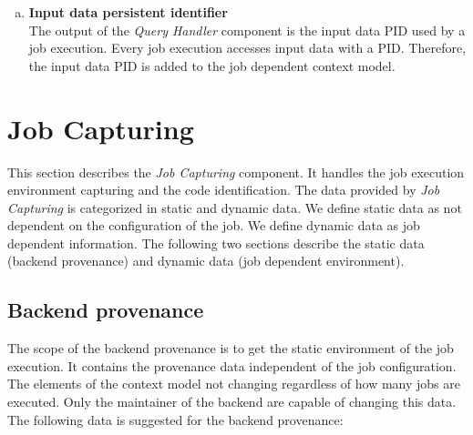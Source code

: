 \documentclass[draft,final]{vutinfth} %
\begin{document}
\begin{enumerate}[(a)]
\item \textbf{Input data persistent identifier} \\
	The output of the \textit{Query Handler} component is the input data PID used by a job execution. Every job execution accesses input data with a PID. Therefore, the input data PID is added to the job dependent context model. 
\end{enumerate}

\section{Job Capturing}\label{Design:Job Capturing}
This section describes the \textit{Job Capturing} component. It handles the job execution environment capturing and the code identification. The data provided by \textit{Job Capturing} is categorized in static and dynamic data. We define static data as not dependent on the configuration of the job. We define dynamic data as job dependent information. The following two sections describe the static data (backend provenance) and dynamic data (job dependent environment).

\subsection{Backend provenance}\label{Design:Backend provenance}
The scope of the backend provenance is to get the static environment of the job execution. It contains the provenance data independent of the job configuration. The elements of the context model not changing regardless of how many jobs are executed. Only the maintainer of the backend are capable of changing this data. The following data is suggested for the backend provenance:
\end{document}

